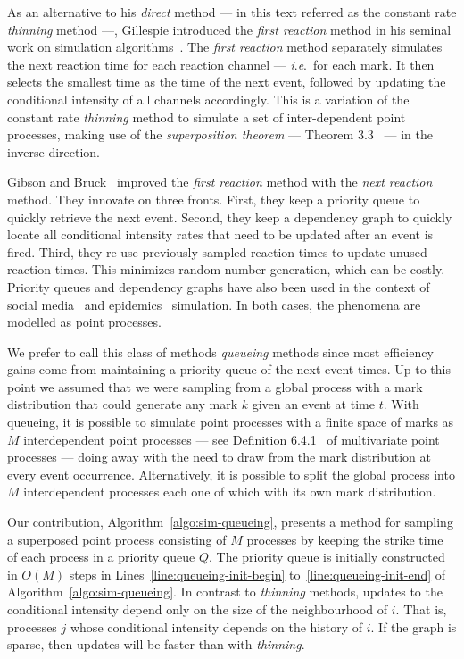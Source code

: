 \documentclass{juliacon}
\numberwithin{equation}{section}
\newcommand{\ie}{\textit{i}.\textit{e}.}
\begin{document}
As an alternative to his \textit{direct} method --- in this text referred as the constant rate \textit{thinning} method ---, Gillespie introduced the \textit{first reaction} method in his seminal work on simulation algorithms~\cite{gillespie1976}. The \textit{first reaction} method separately simulates the next reaction time for each reaction channel --- \ie~for each mark. It then selects the smallest time as the time of the next event, followed by updating the conditional intensity of all channels accordingly. This is a variation of the constant rate \textit{thinning} method to simulate a set of inter-dependent point processes, making use of the \textit{superposition theorem} --- Theorem 3.3~\cite{last2017} --- in the inverse direction.

Gibson and Bruck~\cite{gibson2000} improved the \textit{first reaction} method with the \textit{next reaction} method. They innovate on three fronts. First, they keep a priority queue to quickly retrieve the next event. Second, they keep a dependency graph to quickly locate all conditional intensity rates that need to be updated after an event is fired. Third, they re-use previously sampled reaction times to update unused reaction times. This minimizes random number generation, which can be costly. Priority queues and dependency graphs have also been used in the context of social media~\cite{farajtabar2017} and epidemics~\cite{holme2021} simulation. In both cases, the phenomena are modelled as point processes.

We prefer to call this class of methods \textit{queueing} methods since most efficiency gains come from maintaining a priority queue of the next event times. Up to this point we assumed that we were sampling from a global process with a mark distribution that could generate any mark \( k \) given an event at time \( t \). With queueing, it is possible to simulate point processes with a finite space of marks as \( M \) interdependent point processes --- see Definition 6.4.1~\cite{daley2003} of multivariate point processes --- doing away with the need to draw from the mark distribution at every event occurrence. Alternatively, it is possible to split the global process into \( M \) interdependent processes each one of which with its own mark distribution.

Our contribution, Algorithm~\ref{algo:sim-queueing}, presents a method for sampling a superposed point process consisting of \( M \) processes by keeping the strike time of each process in a priority queue \( Q \). The priority queue is initially constructed in \( O(M) \) steps in Lines~\ref{line:queueing-init-begin} to~\ref{line:queueing-init-end} of Algorithm~\ref{algo:sim-queueing}. In contrast to \textit{thinning} methods, updates to the conditional intensity depend only on the size of the neighbourhood of \( i \). That is, processes \( j \) whose conditional intensity depends on the history of \( i \). If the graph is sparse, then updates will be faster than with \textit{thinning}. 
\end{document}
